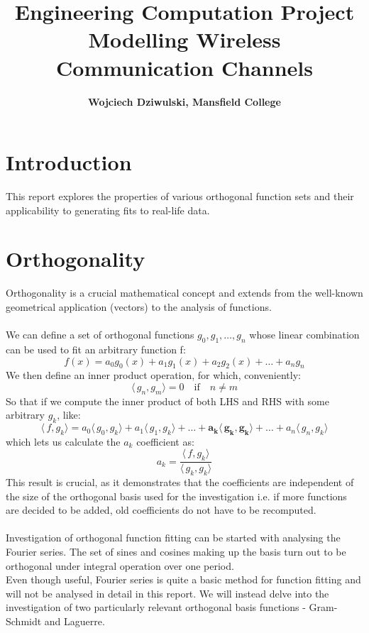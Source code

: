 \documentclass[a4paper]{article}
\title{Engineering Computation Project \\ \large Modelling Wireless Communication Channels}
\author{\textbf{Wojciech Dziwulski, Mansfield College}}
\date{}
\numberwithin{equation}{section}
\begin{document}
\maketitle

\section{Introduction}

This report explores the properties of various orthogonal function sets and their applicability to generating fits to real-life data.

\section{Orthogonality}

Orthogonality is a crucial mathematical concept and extends from the well-known geometrical application (vectors) to the analysis of functions.
\\ \\
We can define a set of orthogonal functions $g_0, g_1, \ldots, g_n$ whose linear combination can be used to fit an arbitrary function f:
\begin{equation}f(x) = a_0 g_0(x)+a_1 g_1(x)+a_2 g_2(x)+\ldots+a_n g_n \end{equation}
\noindent We then define an inner product operation, for which, conveniently:
\begin{equation} \langle\,g_n,g_m\rangle = 0 \quad \textrm{if} \quad n \ne m \end{equation}
So that if we compute the inner product of both LHS and RHS with some arbitrary $g_k$, like:
\begin{equation} \langle\,f,g_k\rangle = a_0\langle\,g_0,g_k\rangle + a_1\langle\,g_1,g_k\rangle + \ldots + \boldsymbol{a_k\langle\,g_k,g_k\rangle} + \ldots + a_n\langle\,g_n,g_k\rangle \end{equation}
which lets us calculate the $a_k$ coefficient as:
\begin{equation} a_k = \frac {\langle\,f,g_k\rangle} {\langle\,g_k,g_k\rangle} \end{equation}
This result is crucial, as it demonstrates that the coefficients are independent of the size of the orthogonal basis used for the investigation i.e. if more functions are decided to be added, old coefficients do not have to be recomputed.
\\ \\
Investigation of orthogonal function fitting can be started with analysing the Fourier series. The set of sines and cosines making up the basis turn out to be orthogonal under integral operation over one period.
\\
Even though useful, Fourier series is quite a basic method for function fitting and will not be analysed in detail in this report. We will instead delve into the investigation of two particularly relevant orthogonal basis functions - Gram-Schmidt and Laguerre.
\end{document}
